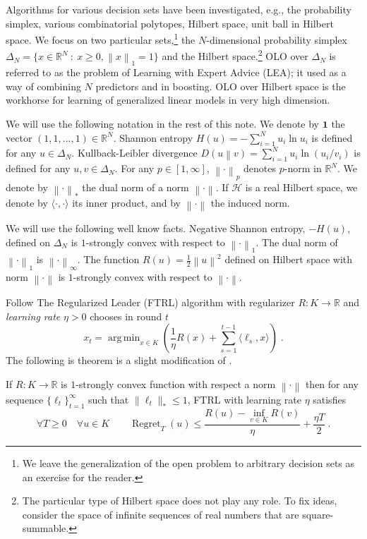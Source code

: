 \documentclass{colt2016} %
\DeclareMathOperator{\Regret}{Regret}
\newcommand{\R}{\mathbb{R}}     %
\renewcommand{\H}{\mathcal{H}}  %
\newcommand{\KL}[2]{D\left({#1}\middle\|{#2}\right)}  %
\newcommand{\norm}[1]{\left\|{#1}\right\|}
\DeclareMathOperator*{\argmin}{arg\,min}
\newcommand{\indicator}{\mathbf{1}}
\begin{document}
Algorithms for various decision sets have been investigated, e.g., the probability
simplex, various combinatorial polytopes, Hilbert space, unit ball in Hilbert
space. We focus on two particular sets,\footnote{We leave the generalization
of the open problem to arbitrary decision sets as an exercise for the reader.} the
$N$-dimensional probability simplex $\Delta_N = \{ x \in \R^N ~:~ x \ge 0,
\norm{x}_1 = 1\}$ and the Hilbert space.\footnote{The particular type of
Hilbert space does not play any role. To fix ideas, consider the space of
infinite sequences of real numbers that are square-summable.} OLO over
$\Delta_N$ is referred to as the problem of Learning with Expert Advice (LEA);
it used as a way of combining $N$ predictors and in boosting. OLO over Hilbert space is the workhorse for learning of generalized
linear models in very high dimension.

We will use the following notation in the rest of this note. We denote by
$\indicator$ the vector $(1,1,\dots,1) \in \R^N$. Shannon entropy $H(u) =
-\sum_{i=1}^N u_i \ln u_i$ is defined for any $u \in \Delta_N$.  Kullback-Leibler
divergence $\KL{u}{v} = \sum_{i=1}^N u_i \ln(u_i/v_i)$ is defined for any $u,v \in
\Delta_N$. For any $p \in [1,\infty]$, $\norm{\cdot}_p$ denotes $p$-norm in
$\R^N$.  We denote by $\norm{\cdot}_*$ the dual norm of a norm $\norm{\cdot}$.
If $\H$ is a real Hilbert space, we denote by $\langle \cdot, \cdot \rangle$
its inner product, and by $\norm{\cdot}$ the induced norm.

We will use the following well know facts.  Negative Shannon entropy, $-H(u)$,
defined on $\Delta_N$ is $1$-strongly convex with respect to $\norm{\cdot}_1$.
The dual norm of $\norm{\cdot}_1$ is $\norm{\cdot}_\infty$.  The function $R(u) =
\frac{1}{2}\norm{u}^2$ defined on Hilbert space with norm $\norm{\cdot}$ is
$1$-strongly convex with respect to $\norm{\cdot}$.

Follow The Regularized Leader (FTRL) algorithm with regularizer $R:K \to \R$
and \emph{learning rate} $\eta > 0$ chooses in round $t$
$$
x_t = \argmin_{x \in K} \left( \frac{1}{\eta} R(x) + \sum_{s=1}^{t-1} \langle \ell_s, x \rangle \right) \; .
$$
The following is theorem is a slight modification of \citet[Theorem 2.11]{Shalev-Shwartz-2011}.
\begin{theorem}
\label{theorem:ftrl-regret}
If $R:K \to \R$ is $1$-strongly convex function with respect a norm $\norm{\cdot}$
then for any sequence $\{\ell_t\}_{t=1}^\infty$ such that $\|\ell_t\|_* \le 1$,
FTRL with learning rate $\eta$ satisfies
$$
\forall T \ge 0 \quad \forall u \in K \qquad \Regret_T(u) \le \frac{R(u) - \inf_{v \in K} R(v)}{\eta} + \frac{\eta T}{2} \; .
$$
\end{theorem}
\end{document}

